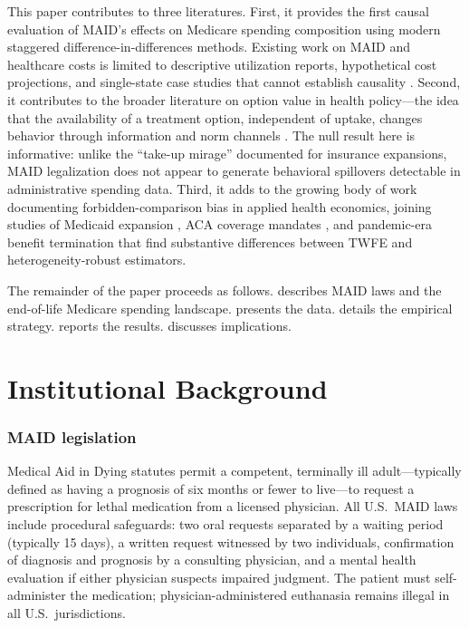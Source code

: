 \documentclass[12pt]{article}
\begin{document}
This paper contributes to three literatures. First, it provides the first causal evaluation of MAID's effects on Medicare spending composition using modern staggered difference-in-differences methods. Existing work on MAID and healthcare costs is limited to descriptive utilization reports, hypothetical cost projections, and single-state case studies that cannot establish causality \citep{emanuel1998, ezekiel2002, campbell2015}. Second, it contributes to the broader literature on option value in health policy---the idea that the availability of a treatment option, independent of uptake, changes behavior through information and norm channels \citep{finkelstein2019}. The null result here is informative: unlike the ``take-up mirage'' documented for insurance expansions, MAID legalization does not appear to generate behavioral spillovers detectable in administrative spending data. Third, it adds to the growing body of work documenting forbidden-comparison bias in applied health economics, joining studies of Medicaid expansion \citep{miller2021}, ACA coverage mandates \citep{duggan2019}, and pandemic-era benefit termination \citep{coombs2022} that find substantive differences between TWFE and heterogeneity-robust estimators.

The remainder of the paper proceeds as follows.  describes MAID laws and the end-of-life Medicare spending landscape.  presents the data.  details the empirical strategy.  reports the results.  discusses implications.


\section{Institutional Background}
\label{sec:background}

\subsubsection*{MAID legislation}
Medical Aid in Dying statutes permit a competent, terminally ill adult---typically defined as having a prognosis of six months or fewer to live---to request a prescription for lethal medication from a licensed physician. All U.S.\ MAID laws include procedural safeguards: two oral requests separated by a waiting period (typically 15 days), a written request witnessed by two individuals, confirmation of diagnosis and prognosis by a consulting physician, and a mental health evaluation if either physician suspects impaired judgment. The patient must self-administer the medication; physician-administered euthanasia remains illegal in all U.S.\ jurisdictions.
\end{document}
